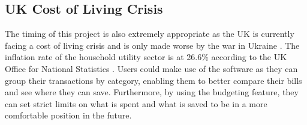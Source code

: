 \subsection{UK Cost of Living Crisis}
The timing of this project is also extremely appropriate as the UK is currently facing a cost of living crisis and is only made worse by the war in Ukraine \cite{CostOfLivingCrisisArticle}. The inflation rate of the household utility sector is at 26.6\% according to the UK Office for National Statistics \cite{CPISectorStats}. Users could make use of the software as they can group their transactions by category, enabling them to better compare their bills and see where they can save. Furthermore, by using the budgeting feature, they can set strict limits on what is spent and what is saved to be in a more comfortable position in the future.

